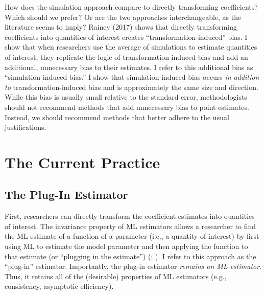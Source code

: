 \documentclass[12pt]{article}
\begin{document}
How does the simulation approach compare to directly transforming coefficients? Which should we prefer? Or are the two approaches interchangeable, as the literature seems to imply? Rainey (2017) shows that directly transforming coefficients into quantities of interest creates ``transformation-induced'' bias. I show that when researchers use the average of simulations to estimate quantities of interest, they replicate the logic of transformation-induced bias and add an additional, unnecessary bias to their estimates. I refer to this additional bias as ``simulation-induced bias.''  I show that simulation-induced bias occurs \textit{in addition to} transformation-induced bias and is approximately the same size and direction. While this bias is usually small relative to the standard error, methodologists should not recommend methods that add unnecessary bias to point estimates. Instead, we should recommend methods that better adhere to the usual justifications. 

\section*{The Current Practice}

\subsection*{The Plug-In Estimator}

First, researchers can directly transform the coefficient estimates into quantities of interest. 
The invariance property of ML estimators allows a researcher to find the ML estimate of a function of a parameter (i.e., a quantity of interest) by first using ML to estimate the model parameter and then applying the function to that estimate (or ``plugging in the estimate'') (\citealt[pp.\@ 75--76]{King1989}; \citealt[pp.\@ 320--321]{CasellaBerger2002}). 
I refer to this approach as the ``plug-in'' estimator. Importantly, the plug-in estimator \textit{remains an ML estimator}. Thus, it retains all of the (desirable) properties of ML estimators (e.g., consistency, asymptotic efficiency). 
\end{document}
